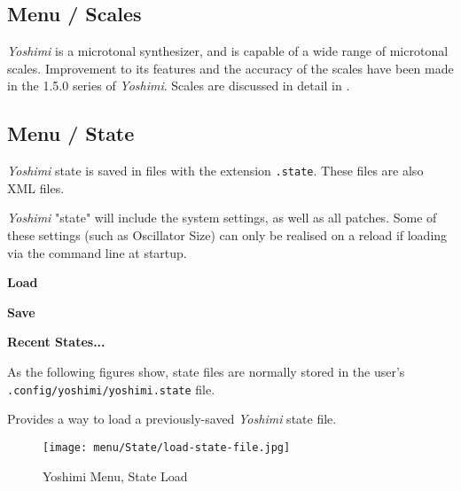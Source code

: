 \subsection{Menu / Scales}
\label{subsec:menu_scales}

   \textsl{Yoshimi} is a microtonal synthesizer, and is capable of a wide
   range of microtonal scales.  Improvement to its features and the accuracy of
   the scales have been made in the 1.5.0 series of \textsl{Yoshimi}.
   Scales are discussed in detail in
   .

\subsection{Menu / State}
\label{subsec:menu_state}

   \textsl{Yoshimi} state is saved in files with the extension
   \texttt{.state}.  These files are also XML files.

   \textsl{Yoshimi} "state" will include the system settings, as well as all
   patches. Some of these settings (such as Oscillator Size) can only be
   realised on a reload if loading via the command line at startup.


   \begin{enumber}
      \item \textbf{Load}
      \item \textbf{Save}
      \item \textbf{Recent States...}
   \end{enumber}

   As the following figures show, state files are normally stored in the
   user's \texttt{.config/yoshimi/yoshimi.state} file.

   \setcounter{ItemCounter}{0}      %

   Provides a way to load a previously-saved \textsl{Yoshimi} state file.

\begin{figure}[H]
   \centering 
   \texttt{[image: menu/State/load-state-file.jpg]}
   \caption{Yoshimi Menu, State Load}
   \label{fig:yoshimi_menu_state_load}
\end{figure}

